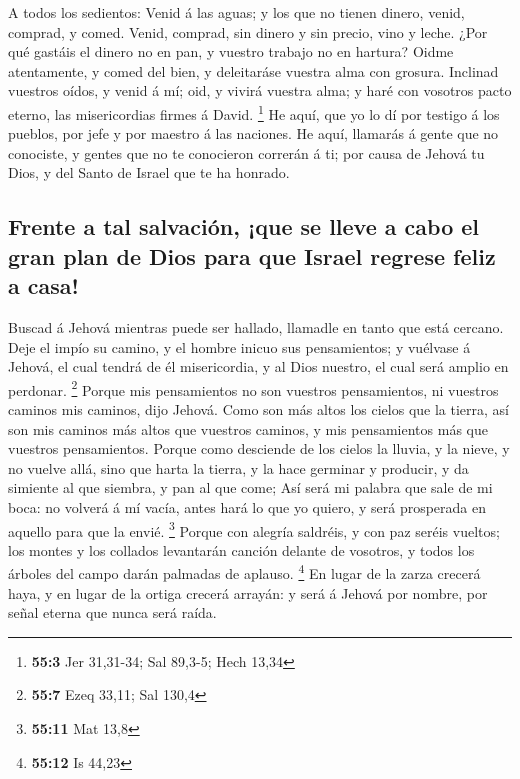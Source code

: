  A todos los sedientos: Venid á las aguas; y los que no
tienen dinero, venid, comprad, y comed. Venid, comprad, sin dinero y sin
precio, vino y leche.  ¿Por qué gastáis el dinero no en
pan, y vuestro trabajo no en hartura? Oidme atentamente, y comed del
bien, y deleitaráse vuestra alma con grosura.  Inclinad
vuestros oídos, y venid á mí; oid, y vivirá vuestra alma; y haré con
vosotros pacto eterno, las misericordias firmes á David. \footnote{\textbf{55:3}
  Jer 31,31-34; Sal 89,3-5; Hech 13,34}  He aquí, que yo
lo dí por testigo á los pueblos, por jefe y por maestro á las naciones.
 He aquí, llamarás á gente que no conociste, y gentes que
no te conocieron correrán á ti; por causa de Jehová tu Dios, y del Santo
de Israel que te ha honrado.

\hypertarget{frente-a-tal-salvaciuxf3n-que-se-lleve-a-cabo-el-gran-plan-de-dios-para-que-israel-regrese-feliz-a-casa}{%
\subsection{Frente a tal salvación, ¡que se lleve a cabo el gran plan de
Dios para que Israel regrese feliz a
casa!}\label{frente-a-tal-salvaciuxf3n-que-se-lleve-a-cabo-el-gran-plan-de-dios-para-que-israel-regrese-feliz-a-casa}}

 Buscad á Jehová mientras puede ser hallado, llamadle en
tanto que está cercano.  Deje el impío su camino, y el
hombre inicuo sus pensamientos; y vuélvase á Jehová, el cual tendrá de
él misericordia, y al Dios nuestro, el cual será amplio en perdonar.
\footnote{\textbf{55:7} Ezeq 33,11; Sal 130,4}  Porque mis
pensamientos no son vuestros pensamientos, ni vuestros caminos mis
caminos, dijo Jehová.  Como son más altos los cielos que
la tierra, así son mis caminos más altos que vuestros caminos, y mis
pensamientos más que vuestros pensamientos.  Porque como
desciende de los cielos la lluvia, y la nieve, y no vuelve allá, sino
que harta la tierra, y la hace germinar y producir, y da simiente al que
siembra, y pan al que come;  Así será mi palabra que sale
de mi boca: no volverá á mí vacía, antes hará lo que yo quiero, y será
prosperada en aquello para que la envié. \footnote{\textbf{55:11} Mat
  13,8}  Porque con alegría saldréis, y con paz seréis
vueltos; los montes y los collados levantarán canción delante de
vosotros, y todos los árboles del campo darán palmadas de aplauso.
\footnote{\textbf{55:12} Is 44,23}  En lugar de la zarza
crecerá haya, y en lugar de la ortiga crecerá arrayán: y será á Jehová
por nombre, por señal eterna que nunca será raída.

